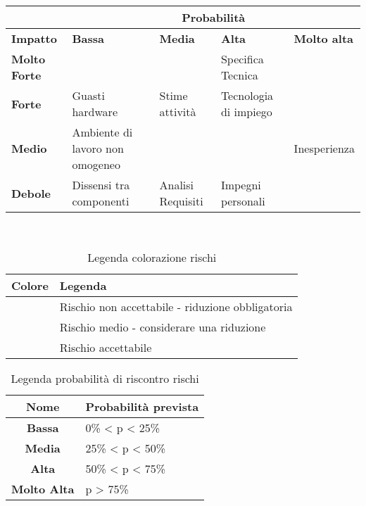 \documentclass{scalatekids-article}
\begin{document}
\begin{table}[H]
  \centering
  \begin{tabular}{|m{2cm}|m{3cm}|m{3cm}|m{3cm}|m{3cm}|}
    \hline
    & \multicolumn{4}{|c|}{\textbf{Probabilità}}\\
    \hline
    \bf Impatto & \bf Bassa & \bf Media & \bf Alta & \textbf{Molto alta} \\
    \hline
    \bf Molto Forte & \cellcolor{red!50} & \cellcolor{red!50} & \cellcolor{red!50} Specifica Tecnica &\cellcolor{red!50} \\
    \hline
    \bf Forte & \cellcolor{yellow!50}Guasti hardware & \cellcolor{yellow!50}Stime attività & \cellcolor{red!50} Tecnologia di impiego &\cellcolor{red!50}\\[8pt]
    \hline
    \bf Medio & \cellcolor{green!50} Ambiente di lavoro non omogeneo & \cellcolor{yellow!50} &\cellcolor{yellow!50} &\cellcolor{red!50}Inesperienza \\[8pt]
    \hline
    \bf Debole & \cellcolor{green!50}Dissensi tra componenti & \cellcolor{green!50} Analisi Requisiti &\cellcolor{yellow!50}Impegni personali &\cellcolor{yellow!50} \\
    \hline
  \end{tabular} \\
\end{table}
\begin{table}[H]
  \centering
  \caption{Legenda colorazione rischi}
  \begin{tabular}{|c|l|}
    \hline \bf Colore & \bf Legenda \\
    \hline \cellcolor{red! 50} & Rischio non accettabile - riduzione obbligatoria \\
    \hline \cellcolor{yellow! 50} & Rischio medio - considerare una riduzione \\
    \hline \cellcolor{green! 50} & Rischio accettabile \\
    \hline
  \end{tabular}
\end{table}
\begin{table}[H]
  \centering
  \caption{Legenda probabilità di riscontro rischi}
  \begin{tabular}{|c|l|}
    \hline \bf Nome & \bf Probabilità prevista \\
    \hline \textbf{Bassa} & 0\% < p < 25\% \\
    \hline \textbf{Media} & 25\% < p < 50\% \\
    \hline \textbf{Alta} & 50\% < p < 75\% \\
    \hline \textbf{Molto Alta} & p > 75\% \\
    \hline
  \end{tabular}
\end{table}
\end{document}

